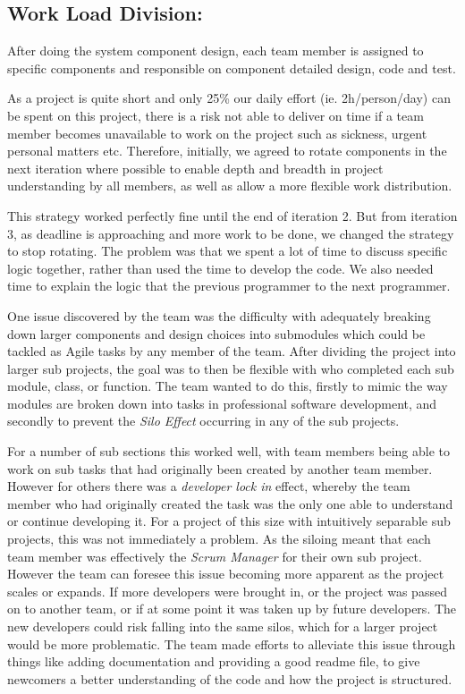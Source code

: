 \documentclass[11pt]{article}
\begin{document}
\subsection{Work Load Division:}

After doing the system component design, each team member is assigned to specific components and responsible on component detailed design, code and test. 

As a project is quite short and only 25\% our daily effort (ie. 2h/person/day) can be spent on this project, there is a risk not able to deliver on time if a team member becomes unavailable to work on the project such as sickness, urgent personal matters etc. Therefore, initially, we agreed to rotate components in the next iteration where possible to enable  depth and breadth in project understanding by all members, as well as allow a more flexible work distribution.

This strategy worked perfectly fine until the end of iteration 2. But from iteration 3, as deadline is approaching and more work to be done, we changed the strategy to stop rotating. The problem was that we spent a lot of time to discuss specific logic together, rather than used the time to develop the code. We also needed time to explain the logic that the previous programmer to the next programmer. 

One issue discovered by the team was the difficulty with adequately breaking down larger components and design choices into submodules which could be tackled as Agile tasks by any member of the team. After dividing the project into larger sub projects, the goal was to then be flexible with who completed each sub module, class, or function. The team wanted to do this, firstly to mimic the way modules are broken down into tasks in professional software development, and secondly to prevent the \textit{Silo Effect} occurring in any of the sub projects. 
	
For a number of sub sections this worked well, with team members being able to work on sub tasks that had originally been created by another team member. However for others there was a \textit{developer lock in} effect, whereby the team member who had originally created the task was the only one able to understand or continue developing it. For a project of this size with intuitively separable sub projects, this was not immediately a problem. As the siloing meant that each team member was effectively the \textit{Scrum Manager} for their own sub project. However the team can foresee this issue becoming more apparent as the project scales or expands. If more developers were brought in, or the project was passed on to another team, or if at some point it was taken up by future developers. The new developers could risk falling into the same silos, which for a larger project would be more problematic. The team made efforts to alleviate this issue through things like adding documentation and providing a good readme file, to give newcomers a better understanding of the code and how the project is structured.
\end{document}
